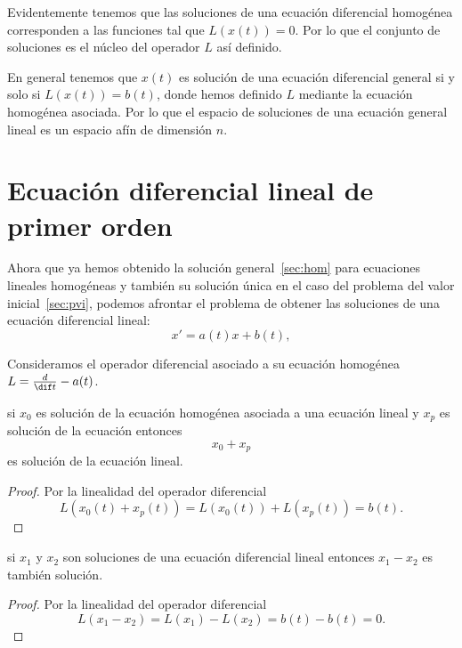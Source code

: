 \documentclass[../main.tex]{subfiles}
\begin{document}
\begin{remark}
	Evidentemente tenemos que las soluciones de una ecuación diferencial
	homogénea corresponden a las funciones tal que \(L(x(t)) = 0\). Por lo que
	el conjunto de soluciones es el núcleo del operador \(L\) así definido.
\end{remark}

\begin{remark}
	En general tenemos que \(x(t)\) es solución de una ecuación diferencial
	general si y solo si \(L(x(t)) = b(t)\), donde hemos definido \(L\)
	mediante la ecuación homogénea asociada. Por lo que el espacio de
	soluciones de una ecuación general lineal es un espacio afín de dimensión
	\(n\).
\end{remark}

\section{Ecuación diferencial lineal de primer orden}

Ahora que ya hemos obtenido la solución general~\autoref{sec:hom} para
ecuaciones lineales homogéneas y también su solución única en el caso del
problema del valor inicial~\autoref{sec:pvi}, podemos afrontar el problema de
obtener las soluciones de una ecuación diferencial lineal:
\[x' = a(t)x + b(t),\]

Consideramos el operador diferencial asociado a su ecuación homogénea
\(L = \frac{d}{\dif t} - a(t)\).

\begin{lemma}
	si \(x_0\) es solución de la ecuación homogénea asociada a una ecuación
	lineal y \(x_p\) es solución de la ecuación entonces
	\[x_0 + x_p\]
	es solución de la ecuación lineal.
\end{lemma}

\begin{proof}
	Por la linealidad del operador diferencial
	\[L(x_0(t) + x_p(t)) = L(x_0(t)) + L(x_p(t)) = b(t).\]
\end{proof}

\begin{lemma}
	si \(x_1\) y \(x_2\) son soluciones de una ecuación diferencial lineal
	entonces \(x_1 - x_2\) es también solución.
\end{lemma}

\begin{proof}
	Por la linealidad del operador diferencial
	\[L(x_1 - x_2) = L(x_1) - L(x_2) = b(t) - b(t) = 0.\]
\end{proof}
\end{document}
